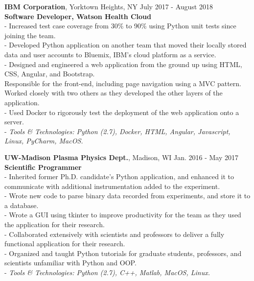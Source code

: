 \documentclass{resume}
\begin{document}
\begin{flushleft}
\textbf{IBM Corporation}, Yorktown Heights, NY \hfill July 2017 - August 2018\\
\textbf{Software Developer, Watson Health Cloud}\\
{\footnotesize
	\ttab- Increased test case coverage from 30\% to 90\% using Python unit tests since joining the team. \\
	\ttab- Developed Python application on another team that moved their locally stored data and user accounts to Bluemix,
	\ttab IBM's cloud platform as a service. \\
	\ttab- Designed and engineered a web application from the ground up using HTML, CSS, Angular, and Bootstrap. \\
	\ttab Responsible for the front-end, including page navigation using a MVC pattern.  Worked closely with two others as they
	\ttab developed the other layers of the application. \\
	\ttab - Used Docker to rigorously test the deployment of the web application onto a server. \\
	\ttab- \textit{Tools \& Technologies: Python (2.7), Docker, HTML, Angular, Javascript, Linux, PyCharm, MacOS.}\\[3mm]
}

\textbf{UW-Madison Plasma Physics Dept.}, Madison, WI \hfill Jan. 2016 - May 2017 \\
\textbf{Scientific Programmer}\\
{\footnotesize
	\ttab- Inherited former Ph.D. candidate's Python application, and enhanced it to communicate with additional instrumentation
	\ttab added to the experiment. \\
	\ttab- Wrote new code to parse binary data recorded from experiments, and store it to a database. \\
	\ttab- Wrote a GUI using tkinter to improve productivity for the team as they used the application for their research. \\
	\ttab- Collaborated extensively with scientists and professors to deliver a fully functional application for their research. \\
	\ttab- Organized and taught Python tutorials for graduate students, professors, and scientists unfamiliar with Python and OOP. \\
	\ttab- \textit{Tools \& Technologies: Python (2.7), C++,  Matlab, MacOS, Linux.}\\[5mm]
}


\end{flushleft}
\end{document}
